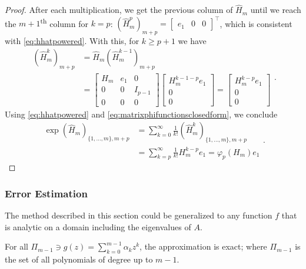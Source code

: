 \begin{proof}
After each multiplication, we get the previous column of $\hat{H}_m$ until we reach the $m+1$\textsuperscript{th} column
for $k=p$: $(\hat{H}_m^p)_{m+p} = \begin{bmatrix}e_1 & 0 & 0\end{bmatrix}^\top$, which is consistent with \autoref{eq:hhatpowered}.
With this, for $k \ge p+1$ we have
\begin{equation}
    \begin{aligned}
        (\hat{H}_m^k)_{m+p} & = \hat{H}_m (\hat{H}_m^{k-1})_{m+p} \\
        & =
        \begin{bmatrix} H_m & e_1 & 0\\ 0 & 0 & I_{p-1}\\ 0 & 0 & 0 \end{bmatrix}
        \begin{bmatrix} H_m^{k-1-p} e_1 \\ 0 \\ 0 \end{bmatrix}
        =
        \begin{bmatrix} H_m^{k-p} e_1 \\ 0 \\ 0 \end{bmatrix}
    \end{aligned}.
\end{equation}
Using \autoref{eq:hhatpowered} and \autoref{eq:matrixphifunctionsclosedform}, we conclude
\begin{equation}
    \begin{aligned}
        \exp(\hat{H}_m)_{\{1, \dots, m\}, m+p}
        & = \sum_{k=0}^{\infty}{\frac{1}{k!} (\hat{H}_m^k)_{\{1, \dots, m\}, m+p}}\\
        & = \sum_{k=p}^{\infty}{\frac{1}{k!} H_m^{k-p}e_1} = \varphi_p(H_m) e_1
    \end{aligned}.
\end{equation}
\end{proof}

\subsubsection{Error Estimation}
The method described in this section could be generalized to any function $f$ that is
analytic on a domain including the eigenvalues of $A$.

\begin{lemma}
    \label{lm:univariateerrorestimationpolynomial}
    For all $\Pi_{m-1} \ni g(z) = \sum_{k=0}^{m-1}{\alpha_k} z^k$, the approximation is exact;
    where $\Pi_{m-1}$ is the set of all polynomials of degree up to $m-1$.
\end{lemma}

